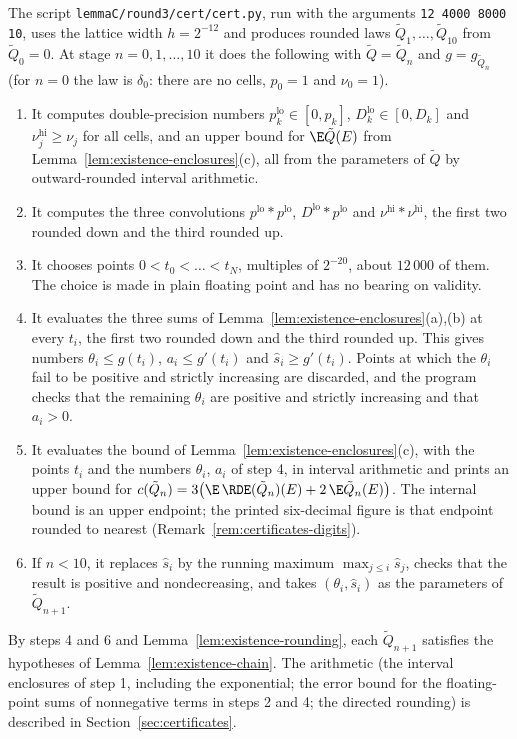 The script \texttt{lemmaC/round3/cert/cert.py}, run with the arguments
\texttt{12 4000 8000 10}, uses the lattice width $h=2^{-12}$ and produces rounded laws
$\tilde Q_1,\dots,\tilde Q_{10}$ from $\tilde Q_0=0$. At stage $n=0,1,\dots,10$ it does the
following with $\tilde Q=\tilde Q_n$ and $g=g_{\tilde Q_n}$ (for $n=0$ the law is $\delta_0$:
there are no cells, $p_0=1$ and $\nu_0=1$).
\begin{enumerate}
\item It computes double-precision numbers $p_k^{\mathrm{lo}}\in[0,p_k]$,
$D_k^{\mathrm{lo}}\in[0,D_k]$ and $\nu_j^{\mathrm{hi}}\ge\nu_j$ for all cells, and an upper
bound for $\E\tilde Q(E)$ from Lemma~\ref{lem:existence-enclosures}(c), all from the
parameters of $\tilde Q$ by outward-rounded interval arithmetic.
\item It computes the three convolutions
$p^{\mathrm{lo}}*p^{\mathrm{lo}}$, $D^{\mathrm{lo}}*p^{\mathrm{lo}}$ and
$\nu^{\mathrm{hi}}*\nu^{\mathrm{hi}}$, the first two rounded down and the third rounded up.
\item It chooses points $0<t_0<\dots<t_N$, multiples of $2^{-20}$, about $12\,000$ of them.
The choice is made in plain floating point and has no bearing on validity.
\item It evaluates the three sums of Lemma~\ref{lem:existence-enclosures}(a),(b) at every
$t_i$, the first two rounded down and the third rounded up. This gives numbers
$\theta_i\le g(t_i)$, $a_i\le g'(t_i)$ and $\hat s_i\ge g'(t_i)$. Points at which the
$\theta_i$ fail to be positive and strictly increasing are discarded, and the program checks
that the remaining $\theta_i$ are positive and strictly increasing and that $a_i>0$.
\item It evaluates the bound of Lemma~\ref{lem:existence-enclosures}(c), with the points
$t_i$ and the numbers $\theta_i$, $a_i$ of step 4, in interval arithmetic and prints an upper
bound for
$c(\tilde Q_n)=3\bigl(\E\,\RDE(\tilde Q_n)(E)+2\,\E\tilde Q_n(E)\bigr)$. The internal bound is an upper
endpoint; the printed six-decimal figure is that endpoint rounded to nearest
(Remark~\ref{rem:certificates-digits}).
\item If $n<10$, it replaces $\hat s_i$ by the running maximum $\max_{j\le i}\hat s_j$, checks
that the result is positive and nondecreasing, and takes $(\theta_i,\hat s_i)$ as the
parameters of $\tilde Q_{n+1}$.
\end{enumerate}
By steps 4 and 6 and Lemma~\ref{lem:existence-rounding}, each $\tilde Q_{n+1}$ satisfies the
hypotheses of Lemma~\ref{lem:existence-chain}. The arithmetic (the interval enclosures of
step 1, including the exponential; the error bound for the floating-point sums of nonnegative
terms in steps 2 and 4; the directed rounding) is described in
Section~\ref{sec:certificates}.

